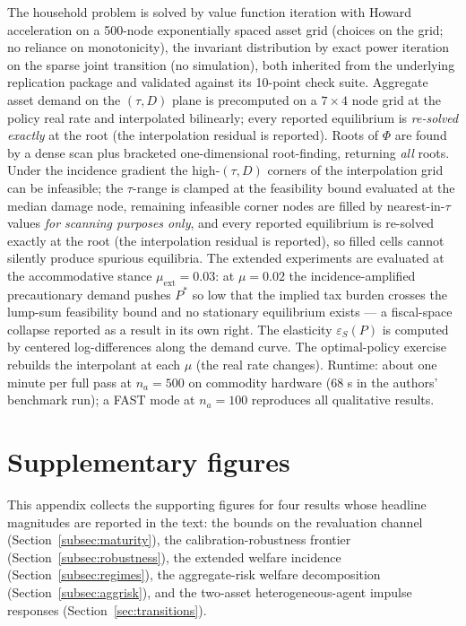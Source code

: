 \documentclass[12pt]{article}
\begin{document}
The household problem is solved by value function iteration with Howard
acceleration on a 500-node exponentially spaced asset grid (choices on the
grid; no reliance on monotonicity), the invariant distribution by exact power
iteration on the sparse joint transition (no simulation), both inherited from
the underlying replication package and validated against its 10-point check
suite. Aggregate asset demand on the $(\tau,D)$ plane is precomputed on a
$7\times4$ node grid at the policy real rate and interpolated bilinearly;
every reported equilibrium is \emph{re-solved exactly} at the root (the
interpolation residual is reported). Roots of $\Phi$ are found by a dense
scan plus bracketed one-dimensional root-finding, returning \emph{all} roots.
Under the incidence
gradient the high-$(\tau,D)$ corners of the interpolation grid can be
infeasible; the $\tau$-range is clamped at the feasibility bound evaluated at
the median damage node, remaining infeasible corner nodes are filled by
nearest-in-$\tau$ values \emph{for scanning purposes only}, and every reported
equilibrium is re-solved exactly at the root (the interpolation residual is
reported), so filled cells cannot silently produce spurious equilibria. The
extended experiments are evaluated at the accommodative stance
$\mu_{\mathrm{ext}}=0.03$: at $\mu=0.02$ the incidence-amplified precautionary
demand pushes $P^{*}$ so low that the implied tax burden crosses the lump-sum
feasibility bound and no stationary equilibrium exists --- a fiscal-space
collapse reported as a result in its own right. The elasticity
$\varepsilon_S(P)$ is computed by centered log-differences along the demand
curve. The optimal-policy exercise rebuilds the interpolant at each $\mu$
(the real rate changes). Runtime: about one minute per full pass at
$n_a=500$ on commodity hardware (68 s in the authors' benchmark run); a FAST
mode at $n_a=100$ reproduces all qualitative results.

\section{Supplementary figures}\label{app:figures}

This appendix collects the supporting figures for four results whose headline
magnitudes are reported in the text: the bounds on the revaluation channel
(Section~\ref{subsec:maturity}), the calibration-robustness frontier
(Section~\ref{subsec:robustness}), the extended welfare incidence
(Section~\ref{subsec:regimes}), the aggregate-risk welfare decomposition
(Section~\ref{subsec:aggrisk}), and the two-asset heterogeneous-agent
impulse responses (Section~\ref{sec:transitions}).
\end{document}
